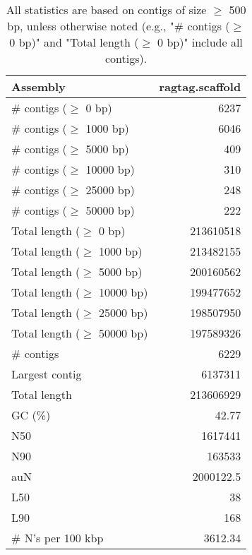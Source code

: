 \documentclass[12pt,a4paper]{article}
\begin{document}
\begin{table}[ht]
\begin{center}
\caption{All statistics are based on contigs of size $\geq$ 500 bp, unless otherwise noted (e.g., "\# contigs ($\geq$ 0 bp)" and "Total length ($\geq$ 0 bp)" include all contigs).}
\begin{tabular}{|l*{1}{|r}|}
\hline
Assembly & ragtag.scaffold \\ \hline
\# contigs ($\geq$ 0 bp) & 6237 \\ \hline
\# contigs ($\geq$ 1000 bp) & 6046 \\ \hline
\# contigs ($\geq$ 5000 bp) & 409 \\ \hline
\# contigs ($\geq$ 10000 bp) & 310 \\ \hline
\# contigs ($\geq$ 25000 bp) & 248 \\ \hline
\# contigs ($\geq$ 50000 bp) & 222 \\ \hline
Total length ($\geq$ 0 bp) & 213610518 \\ \hline
Total length ($\geq$ 1000 bp) & 213482155 \\ \hline
Total length ($\geq$ 5000 bp) & 200160562 \\ \hline
Total length ($\geq$ 10000 bp) & 199477652 \\ \hline
Total length ($\geq$ 25000 bp) & 198507950 \\ \hline
Total length ($\geq$ 50000 bp) & 197589326 \\ \hline
\# contigs & 6229 \\ \hline
Largest contig & 6137311 \\ \hline
Total length & 213606929 \\ \hline
GC (\%) & 42.77 \\ \hline
N50 & 1617441 \\ \hline
N90 & 163533 \\ \hline
auN & 2000122.5 \\ \hline
L50 & 38 \\ \hline
L90 & 168 \\ \hline
\# N's per 100 kbp & 3612.34 \\ \hline
\end{tabular}
\end{center}
\end{table}
\end{document}

